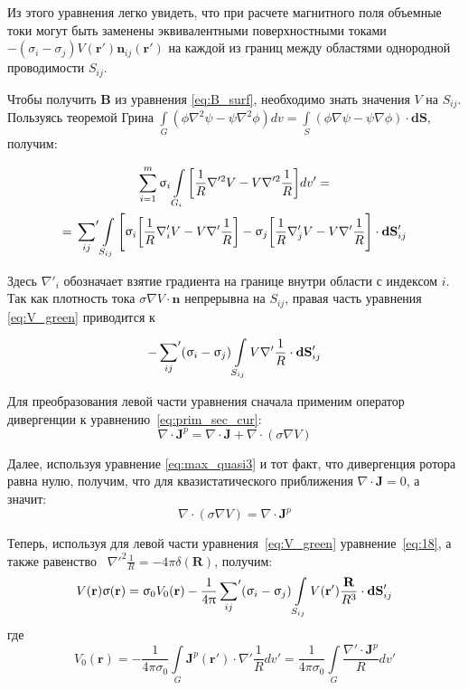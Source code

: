Из этого уравнения легко увидеть, что при расчете магнитного поля  объемные токи могут быть
заменены эквивалентными поверхностными токами
$-(\sigma_i - \sigma_j) V(\mathbf{r}')\mathbf{n}_{ij}(\mathbf{r}')$
на каждой из границ между областями однородной проводимости $S_{ij}$.

Чтобы получить $\mathbf{B}$ из уравнения \ref{eq:B_surf}, необходимо знать значения $V$ на $S_{ij}$.
Пользуясь теоремой Грина $\int\limits_{G}(\phi\nabla^2\psi - \psi\nabla^2\phi)dv = \int\limits_{S}(\phi\nabla\psi-\psi\nabla\phi)\cdot \mathbf{dS}$, получим:

\begin{multline}
    \sum_{i=1}^m\sigma_i\int\limits_{G_i} \bigg[\frac{1}{R} \nabla'^2V - V\nabla'^2 \frac{1}{R}\bigg]dv'=\\
    = \sideset{}{'}\sum_{ij}\int\limits_{S_{ij}}\Bigg[\sigma_i\bigg[\frac{1}{R}\nabla'_iV -
        V\nabla'\frac{1}{R}\bigg] - \sigma_j \bigg[\frac{1}{R}\nabla'_j V - V \nabla'\frac{1}{R}\Bigg]
        \cdot\mathbf{dS}'_{ij}
        \label{eq:V_green}
\end{multline}


Здесь $\nabla'_i$ обозначает взятие градиента на границе внутри области с индексом $i$.
Так как плотность тока $\sigma\nabla V \cdot \mathbf{n}$ непрерывна на $S_{ij}$, правая часть уравнения
\ref{eq:V_green} приводится к

\begin{equation}
    {-\sideset{}{'}\sum_{ij}(\sigma_i - \sigma_j)}
\int\limits_{S_{ij}} V\nabla'\frac{1}{R}\cdot\mathbf{dS}'_{ij}
\end{equation}

Для преобразования левой части уравнения сначала применим оператор дивергенции
к уравнению~\ref{eq:prim_sec_cur}:
\begin{equation}
    \nabla \cdot \mathbf{J}^p = \nabla \cdot \mathbf{J} + \nabla \cdot(\sigma\nabla V)
\end{equation}

Далее, используя уравнение \ref{eq:max_quasi3} и тот факт, что дивергенция ротора равна нулю,
получим, что для квазистатического приближения $\nabla \cdot \mathbf{J} = 0$, а значит:
\begin{equation}
    \nabla\cdot(\sigma\nabla V) = \nabla \cdot \mathbf{J}^p
    \label{eq:18}
\end{equation}

Теперь, используя для левой части уравнения~\ref{eq:V_green} уравнение~\ref{eq:18}, а также равенство~
${\nabla'}^2\frac{1}{R} = {-4\pi\delta(\mathbf{R})}$, получим:
\begin{equation}
    V(\mathbf{r})\sigma(\mathbf{r}) = \sigma_0V_0(\mathbf{r}) -
    \frac{1}{4\pi}\sideset{}{'}\sum_{ij}(\sigma_i - \sigma_j)
    \int \limits_{S_{ij}}V(\mathbf{r}')\frac{\mathbf{R}}{R^3}\cdot \mathbf{dS}'_{ij}
\end{equation}
где
\begin{equation}
    V_0(\mathbf{r}) =
    {-\frac{1}{4\pi\sigma_0}\int\limits_{G}\mathbf{J}^p(\mathbf{r}')\cdot\nabla'\frac{1}{R}dv'} =
    \frac{1}{4\pi\sigma_0} \int\limits_{G}\frac{\nabla'\cdot \mathbf{J}^p}{R} dv'
\end{equation}

